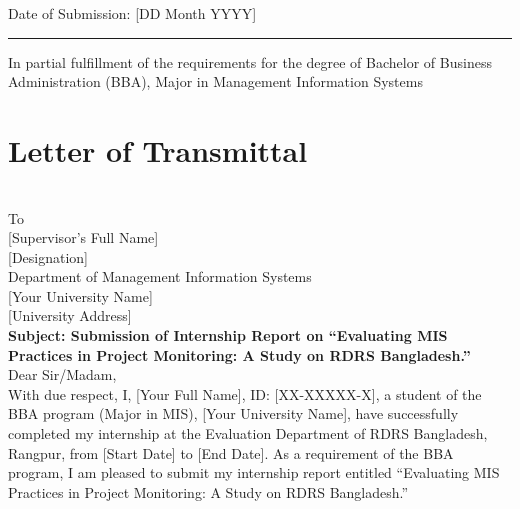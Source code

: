 \documentclass[12pt,a4paper]{report}
\begin{document}
\begin{titlepage}
    \vfill

    {\large Date of Submission: [DD Month YYYY] \par} %
    \vspace{8pt}
    \rule{\textwidth}{1.5pt}
    \vspace{6pt}
    {\small In partial fulfillment of the requirements for the degree of
        Bachelor of Business Administration (BBA), Major in Management
        Information Systems \par}
\end{titlepage}


\chapter*{Letter of Transmittal}

 \\[6pt]
To\\[6pt]
[Supervisor's Full Name]\\[2pt]
[Designation]\\[2pt]
Department of Management Information Systems\\[2pt]
[Your University Name]\\[2pt]
[University Address]\\[12pt]

\noindent
\textbf{Subject: Submission of Internship Report on ``Evaluating MIS
Practices in Project Monitoring: A Study on RDRS Bangladesh.''}\\[12pt]

\noindent
Dear Sir/Madam,\\[6pt]

With due respect, I, [Your Full Name], ID: [XX-XXXXX-X], a student of the
BBA program (Major in MIS), [Your University Name], have successfully
completed my internship at the Evaluation Department of RDRS Bangladesh,
Rangpur, from [Start Date] to [End Date]. As a requirement of the BBA
program, I am pleased to submit my internship report entitled
``Evaluating MIS Practices in Project Monitoring: A Study on RDRS
Bangladesh.''
\end{document}
